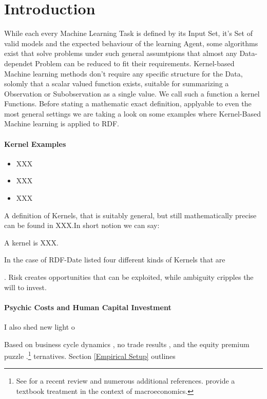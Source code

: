
\section{Introduction}
While each every Machine Learning Task is defined by its Input Set, it's Set of valid models and the expected behaviour of the learning Agent, some algorithms exist that solve problems under such general assumtpions that almost any Data-dependet Problem can be reduced to fit their requirements. Kernel-based Machine learning methods don't require any specific structure for the Data, solomly that a scalar valued function exists, suitable for summarizing a Observation or Subobservation as a single value. We call such a function a kernel Functions. Before stating a mathematic exact definition, applyable to even the most general settings we are taking a look on some examples where Kernel-Based Machine learning is applied to RDF. 

\paragraph{Kernel Examples}
\begin{itemize}
\item XXX
\item XXX
\item XXX
\end{itemize}

A definition of Kernels, that is suitably general, but still mathematically precise can be found in XXX.In short notion we can say:

\begin{Definition}
A kernel is XXX.
\end{Definition}

In the case of RDF-Date \citet{mainsource} listed four different kinds of Kernels that are 



. Risk creates opportunities that can be exploited, while ambiguity cripples the will to invest.

\paragraph{Psychic Costs and Human Capital Investment} I also shed new light o

\noindent Based on business cycle dynamics \citet{mainsource}, no trade results \citep{Dow.1992}, and the equity premium puzzle \citep{Hansen.1999}.\footnote{See \citet{mainsource} for a recent review and numerous additional references. \citet{Hansen.2016} provide a textbook treatment in the context of macroeconomics.} ternatives. Section \ref{Empirical Setup} outlines 

